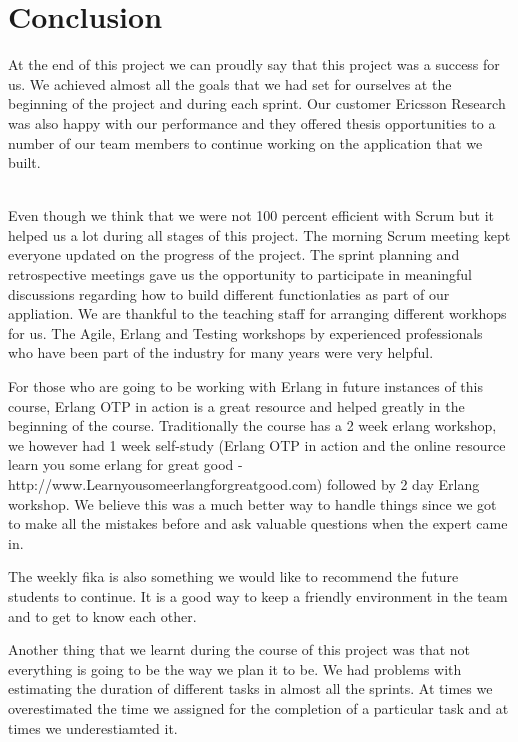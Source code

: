 \section{Conclusion}
At the end of this project we can proudly say that this project was a success for us. We achieved almost all the goals that we had set for ourselves at the beginning of the project and during each sprint. Our customer Ericsson Research was also happy with our performance and they offered thesis opportunities to a number of our team members to continue working on the application that we built. 

\\
Even though we think that we were not 100 percent efficient with Scrum but it helped us a lot during all stages of this project. The morning Scrum meeting kept everyone updated on the progress of the project. The sprint planning and retrospective meetings gave us the opportunity to participate in meaningful discussions regarding how to build different functionlaties as part of our appliation. We are thankful to the teaching staff for arranging different workhops for us. The Agile, Erlang and Testing workshops by experienced professionals who have been part of the industry for many years were very helpful. 

For those who are going to be working with Erlang in future instances of this course, Erlang OTP in action is a great resource and helped greatly in the beginning of the course. Traditionally the course has a 2 week erlang workshop, we however had 1 week self-study (Erlang OTP in action and the online resource learn you some erlang for great good - http://www.Learnyousomeerlangforgreatgood.com) followed by 2 day Erlang workshop. We believe this was a much better way to handle things since we got to make all the mistakes before and ask valuable questions when the expert came in. 

The weekly fika is also something we would like to recommend the future students to continue. It is a good way to keep a friendly environment in the team and to get to know each other.     

Another thing that we learnt during the course of this project was that not everything is going to be the way we plan it to be. We had problems with estimating the duration of different tasks in almost all the sprints. At times we overestimated the time we assigned for the completion of a particular task and at times we underestiamted it. 


